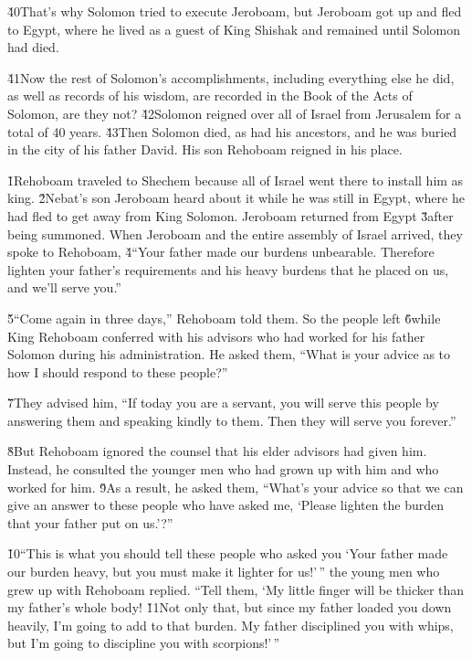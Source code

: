 \v{40}That's why Solomon tried to execute Jeroboam, but Jeroboam got up and fled to Egypt, where he lived as a guest of King Shishak and remained until Solomon had died.

\v{41}Now the rest of Solomon's accomplishments, including everything else he did, as well as records of his wisdom, are recorded in the Book of the Acts of Solomon, are they not? \v{42}Solomon reigned over all of Israel from Jerusalem for a total of 40 years. \v{43}Then Solomon died, as had his ancestors, and he was buried in the city of his father David. His son Rehoboam reigned in his place.

\v{1}Rehoboam traveled to Shechem because all of Israel went there to install him as king. \v{2}Nebat's son Jeroboam heard about it while he was still in Egypt, where he had fled to get away from King Solomon. Jeroboam returned from Egypt \v{3}after being summoned. When Jeroboam and the entire assembly of Israel arrived, they spoke to Rehoboam, \v{4}``Your father made our burdens unbearable. Therefore lighten your father's requirements and his heavy burdens that he placed on us, and we'll serve you.''

\v{5}``Come again in three days,'' Rehoboam told them. So the people left \v{6}while King Rehoboam conferred with his advisors who had worked for his father Solomon during his administration. He asked them, ``What is your advice as to how I should respond to these people?''

\v{7}They advised him, ``If today you are a servant, you will serve this people by answering them and speaking kindly to them. Then they will serve you forever.''

\v{8}But Rehoboam ignored the counsel that his elder advisors had given him. Instead, he consulted the younger men who had grown up with him and who worked for him. \v{9}As a result, he asked them, ``What's your advice so that we can give an answer to these people who have asked me, `Please lighten the burden that your father put on us.'?''

\v{10}``This is what you should tell these people who asked you `Your father made our burden heavy, but you must make it lighter for us!'\,'' the young men who grew up with Rehoboam replied. ``Tell them, `My little finger will be thicker than my father's whole body! \v{11}Not only that, but since my father loaded you down heavily, I'm going to add to that burden. My father disciplined you with whips, but I'm going to discipline you with scorpions!'\,''

